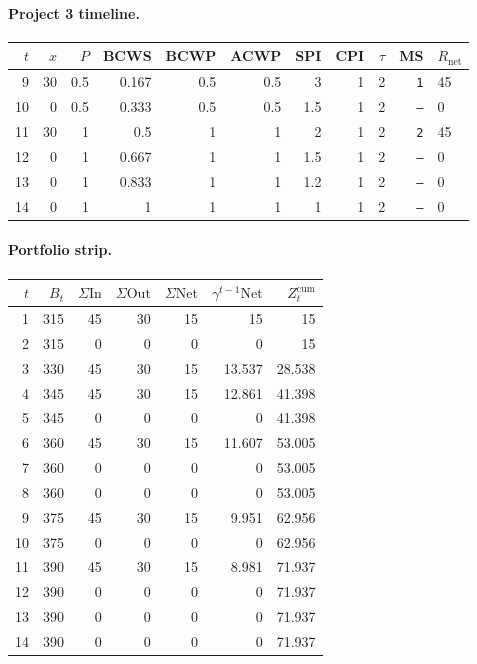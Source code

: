 \documentclass[12pt, a4paper]{article}
\begin{document}
\paragraph{Project 3 timeline.}
\begin{center}
\begin{tabular}{rrrrrrrrrrl}
\toprule
$t$ & $x$ & $P$ & BCWS & BCWP & ACWP & SPI & CPI & $\tau$ & MS & $R_{\mathrm{net}}$\\
\midrule
9 & 30 & 0.5 & 0.167 & 0.5 & 0.5 & 3 & 1 & 2 & \texttt{1} & 45 \\
10 & 0 & 0.5 & 0.333 & 0.5 & 0.5 & 1.5 & 1 & 2 & \texttt{---} & 0 \\
11 & 30 & 1 & 0.5 & 1 & 1 & 2 & 1 & 2 & \texttt{2} & 45 \\
12 & 0 & 1 & 0.667 & 1 & 1 & 1.5 & 1 & 2 & \texttt{---} & 0 \\
13 & 0 & 1 & 0.833 & 1 & 1 & 1.2 & 1 & 2 & \texttt{---} & 0 \\
14 & 0 & 1 & 1 & 1 & 1 & 1 & 1 & 2 & \texttt{---} & 0 \\
\bottomrule
\end{tabular}
\end{center}
\paragraph{Portfolio strip.}
\begin{center}
\begin{tabular}{rrrrrrr}
\toprule
$t$ & $B_t$ & $\Sigma\mathrm{In}$ & $\Sigma\mathrm{Out}$ & $\Sigma\mathrm{Net}$ & $\gamma^{t-1}\mathrm{Net}$ & $Z_t^{\mathrm{cum}}$\\
\midrule
1 & 315 & 45 & 30 & 15 & 15 & 15 \\
2 & 315 & 0 & 0 & 0 & 0 & 15 \\
3 & 330 & 45 & 30 & 15 & 13.537 & 28.538 \\
4 & 345 & 45 & 30 & 15 & 12.861 & 41.398 \\
5 & 345 & 0 & 0 & 0 & 0 & 41.398 \\
6 & 360 & 45 & 30 & 15 & 11.607 & 53.005 \\
7 & 360 & 0 & 0 & 0 & 0 & 53.005 \\
8 & 360 & 0 & 0 & 0 & 0 & 53.005 \\
9 & 375 & 45 & 30 & 15 & 9.951 & 62.956 \\
10 & 375 & 0 & 0 & 0 & 0 & 62.956 \\
11 & 390 & 45 & 30 & 15 & 8.981 & 71.937 \\
12 & 390 & 0 & 0 & 0 & 0 & 71.937 \\
13 & 390 & 0 & 0 & 0 & 0 & 71.937 \\
14 & 390 & 0 & 0 & 0 & 0 & 71.937 \\
\bottomrule
\end{tabular}
\end{center}
\end{document}
